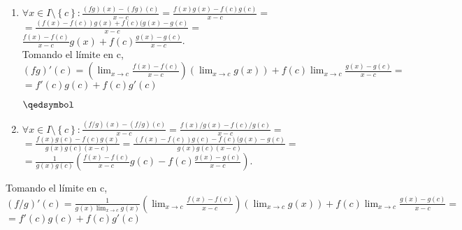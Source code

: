 \documentclass{beamer}
\newcounter{saveenumi}
\newcommand{\conti}{\setcounter{enumi}{\value{saveenumi}}}
\begin{document}
\begin{frame}
\begin{enumerate}[label=(\alph*)]
\conti
\item
$\forall{x}\in{I\setminus\left\{c\right\}}: \displaystyle\frac{(fg)(x)-(fg)(c)}{x-c}=\frac{f(x)g(x)-f(c)g(c)}{x-c} =$\\$\displaystyle=  \frac{(f(x)-f(c))g(x) + f(c)(g(x)-g(c)}{x-c} =$\\$ \frac{f(x)-f(c)}{x-c}g(x) + f(c)\frac{g(x)-g(c)}{x-c}$.
\\Tomando el límite en c,\\
$(fg)'(c)=\left(\displaystyle\lim_{x \to c}\frac{f(x)-f(c)}{x-c}\right)\left(\displaystyle\lim_{x \to c}g(x)\right) + f(c)\displaystyle\lim_{x \to c}\frac{g(x)-g(c)}{x-c}  =$ \\$ =f'(c)g(c)+f(c)g'(c) $\\
\begin{flushright}
$\qedsymbol$
\end{flushright}
\item $\forall{x}\in{I\setminus\left\{c\right\}}: \displaystyle \frac{(f/g)(x)-(f/g)(c)}{x-c}=\frac{f(x)/g(x)-f(c)/g(c)}{x-c} =$\\$\displaystyle=\frac{f(x)g(c)-f(c)g(x)}{g(x)g(c)(x-c)} =\frac{(f(x)-f(c))g(c) - f(c)(g(x)-g(c)}{g(x)g(c)(x-c)} =$ \\ $\displaystyle= \frac{1}{g(x)g(c)}\left( \frac{f(x)-f(c)}{x-c}g(c) - f(c)\frac{g(x)-g(c)}{x-c}\right)$.

\end{enumerate}
\end{frame}

\begin{frame}
Tomando el límite en c,\\
$(f/g)'(c)=\frac{1}{g(x)\displaystyle\lim_{x \to c} g(x)}\left(\displaystyle\lim_{x \to c}\frac{f(x)-f(c)}{x-c}\right)\left(\displaystyle\lim_{x \to c}g(x)\right) + f(c)\displaystyle\lim_{x \to c}\frac{g(x)-g(c)}{x-c}  =$ \\$ =f'(c)g(c)+f(c)g'(c) $

\end{frame}
\end{document}
